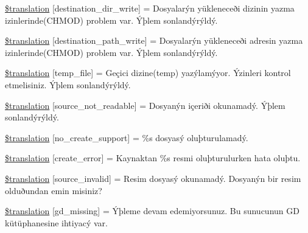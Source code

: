 \begin{DoxyCompactItemize}
\item 
\hyperlink{class_8upload_8tr___t_r_8php_a97608ea194a616db49141a0e6dee900c}{\$translation} \mbox{[}\textquotesingle{}destination\+\_\+dir\+\_\+write\textquotesingle{}\mbox{]} = \textquotesingle{}Dosyalarýn yükleneceði dizinin yazma izinlerinde(C\+H\+M\+O\+D) problem var. Ýþlem sonlandýrýldý.\textquotesingle{}
\item 
\hyperlink{class_8upload_8tr___t_r_8php_a40e4e1962226b89fd76da5819a9602b0}{\$translation} \mbox{[}\textquotesingle{}destination\+\_\+path\+\_\+write\textquotesingle{}\mbox{]} = \textquotesingle{}Dosyalarýn yükleneceði adresin yazma izinlerinde(C\+H\+M\+O\+D) problem var. Ýþlem sonlandýrýldý.\textquotesingle{}
\item 
\hyperlink{class_8upload_8tr___t_r_8php_a2baece8da11e20d45175db91851ec3e3}{\$translation} \mbox{[}\textquotesingle{}temp\+\_\+file\textquotesingle{}\mbox{]} = \textquotesingle{}Geçici dizine(temp) yazýlamýyor. Ýzinleri kontrol etmelisiniz. Ýþlem sonlandýrýldý.\textquotesingle{}
\item 
\hyperlink{class_8upload_8tr___t_r_8php_a922967ca2df0efdd455261142d8e5715}{\$translation} \mbox{[}\textquotesingle{}source\+\_\+not\+\_\+readable\textquotesingle{}\mbox{]} = \textquotesingle{}Dosyanýn içeriði okunamadý. Ýþlem sonlandýrýldý.\textquotesingle{}
\item 
\hyperlink{class_8upload_8tr___t_r_8php_a346dfd1ade29f583dd20d345c436859f}{\$translation} \mbox{[}\textquotesingle{}no\+\_\+create\+\_\+support\textquotesingle{}\mbox{]} = \textquotesingle{}\%s dosyasý oluþturulamadý.\textquotesingle{}
\item 
\hyperlink{class_8upload_8tr___t_r_8php_a53013ce9255c4e1849098ddd9fdb2b3f}{\$translation} \mbox{[}\textquotesingle{}create\+\_\+error\textquotesingle{}\mbox{]} = \textquotesingle{}Kaynaktan \%s resmi oluþturulurken hata oluþtu.\textquotesingle{}
\item 
\hyperlink{class_8upload_8tr___t_r_8php_a6ab0a660b457eaf2d3434b225449fdd6}{\$translation} \mbox{[}\textquotesingle{}source\+\_\+invalid\textquotesingle{}\mbox{]} = \textquotesingle{}Resim dosyasý okunamadý. Dosyanýn bir resim olduðundan emin misiniz?\textquotesingle{}
\item 
\hyperlink{class_8upload_8tr___t_r_8php_a7f3dfcc0db4bbc0f2e7210c439798e56}{\$translation} \mbox{[}\textquotesingle{}gd\+\_\+missing\textquotesingle{}\mbox{]} = \textquotesingle{}Ýþleme devam edemiyorsunuz. Bu sunucunun G\+D kütüphanesine ihtiyacý var.\textquotesingle{}
\item 

\end{DoxyCompactItemize}
